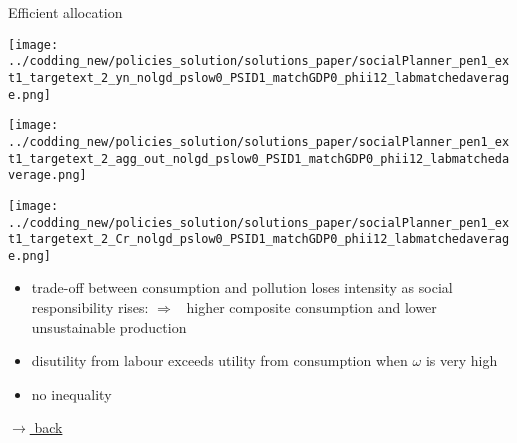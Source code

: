 \documentclass[11pt,aspectratio=169]{beamer}
\newcommand{\ar}{$\Rightarrow$ \ }
\begin{document}
	\begin{frame}{Efficient allocation}
		\hypertarget{effallo}{}
		\begin{minipage}[]{0.32\textwidth}
			\texttt{[image: ../codding\_new/policies\_solution/solutions\_paper/socialPlanner\_pen1\_ext1\_targetext\_2\_yn\_nolgd\_pslow0\_PSID1\_matchGDP0\_phii12\_labmatchedaverage.png]}
		\end{minipage}
		\begin{minipage}[]{0.32\textwidth}
			\texttt{[image: ../codding\_new/policies\_solution/solutions\_paper/socialPlanner\_pen1\_ext1\_targetext\_2\_agg\_out\_nolgd\_pslow0\_PSID1\_matchGDP0\_phii12\_labmatchedaverage.png]}
		\end{minipage}
		\begin{minipage}[]{0.32\textwidth}
			\texttt{[image: ../codding\_new/policies\_solution/solutions\_paper/socialPlanner\_pen1\_ext1\_targetext\_2\_Cr\_nolgd\_pslow0\_PSID1\_matchGDP0\_phii12\_labmatchedaverage.png]}
		\end{minipage}
	\vspace{4mm}
		\begin{itemize}
			\item trade-off between consumption and pollution loses intensity as social responsibility rises: \ar higher composite consumption and lower unsustainable production 
			\item disutility from labour exceeds utility from consumption when $\omega$ is very high
			\item no inequality
		\end{itemize}
		\vspace{-3mm}
		\hfill
		\hyperlink{backeff}{\tiny{$\rightarrow$ back}}
	\end{frame}	
	
\end{document}

